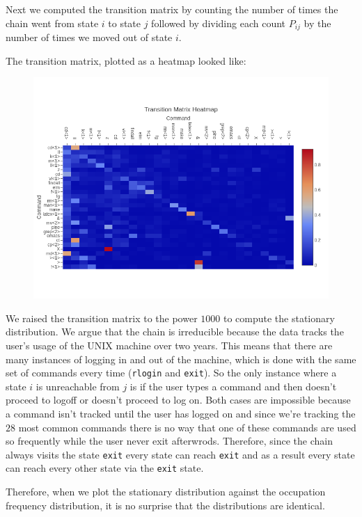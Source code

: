 \documentclass[10pt]{article}
\begin{document}
Next we computed the transition matrix by counting the number of times the chain
went from state $i$ to state $j$ followed by dividing each count $P_{ij}$ by the
number of times we moved out of state $i$.

The transition matrix, plotted as a heatmap looked like:

\begin{figure}[ht]
  \centering
  \includegraphics[scale=.65]{../pictures/transition-matrix-heatmap.png}
\end{figure}

We raised the transition matrix to the power $1000$ to compute the stationary
distribution. We argue that the chain is irreducible because the data tracks the
user's usage of the UNIX machine over two years. This means that there are many
instances of logging in and out of the machine, which is done with the same set
of commands every time (\texttt{rlogin} and \texttt{exit}). So the only instance
where a state $i$ is unreachable from $j$ is if the user types a command and
then doesn't proceed to logoff or doesn't proceed to log on. Both cases are
impossible because a command isn't tracked until the user has logged on and
since we're tracking the $28$ most common commands there is no way that one of
these commands are used so frequently while the user never exit afterwrods.
Therefore, since the chain always visits the state \texttt{exit} every state can
reach \texttt{exit} and as a result every state can reach every other state via
the \texttt{exit} state.

Therefore, when we plot the stationary distribution
against the occupation frequency distribution, it is no surprise that the
distributions are identical.
\end{document}
